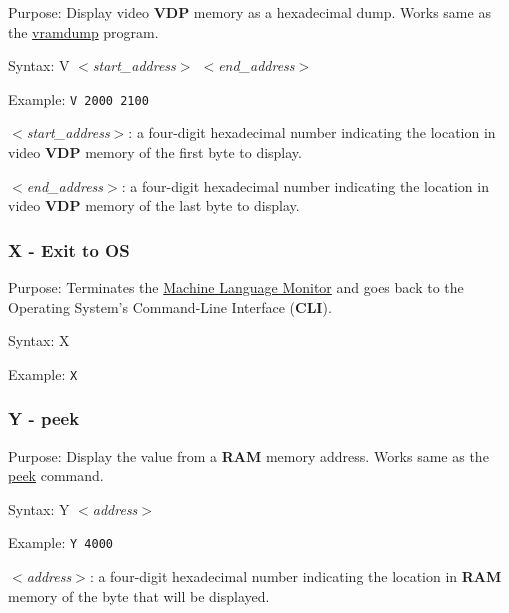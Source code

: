         Purpose: Display video \textbf{VDP} memory as a hexadecimal dump. Works
        same as the \hyperref[software:vramdump]{vramdump} program.

        Syntax: V \textit{$<$start\_address$>$ $<$end\_address$>$}

        Example: \texttt{V 2000 2100}

        \hspace{1cm}\textit{$<$start\_address$>$}: a four-digit hexadecimal
        number indicating the location in video \textbf{VDP} memory of the first
        byte to display.

        \hspace{1cm}\textit{$<$end\_address$>$}: a four-digit hexadecimal
        number indicating the location in video \textbf{VDP} memory of the last
        byte to display.

        \subsubsection{X - Exit to OS}

        Purpose: Terminates the \hyperref[software:mlmonitor]
        {Machine Language Monitor} and goes back to the Operating System's
        Command-Line Interface (\textbf{CLI}).

        Syntax: X

        Example: \texttt{X}

        \subsubsection{Y - peek}

        Purpose: Display the value from a \textbf{RAM} memory address. Works
        same as the \hyperref[cmd:peek]{peek} command.

        Syntax: Y \textit{$<$address$>$}

        Example: \texttt{Y 4000}

        \hspace{1cm}\textit{$<$address$>$}: a four-digit hexadecimal number
        indicating the location in \textbf{RAM} memory of the byte that will be
        displayed.

